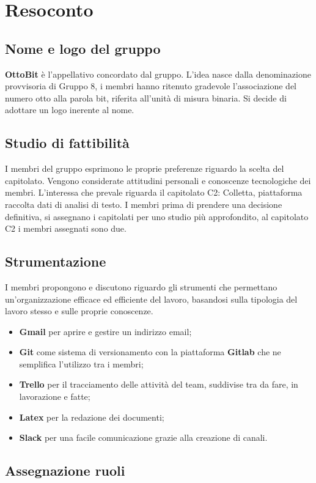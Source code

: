 \documentclass[11pt,a4paper]{article}
\begin{document}
	\section{Resoconto}	
	\subsection{Nome e logo del gruppo}
	\textbf{OttoBit} è l'appellativo concordato dal gruppo. L'idea nasce dalla denominazione provvisoria di Gruppo 8, i membri hanno ritenuto gradevole l'associazione del numero otto alla parola bit, riferita all'unità di misura binaria. Si decide di adottare un logo inerente al nome.
	\subsection{Studio di fattibilità}
	I membri del gruppo esprimono le proprie preferenze riguardo la scelta del capitolato. Vengono considerate attitudini personali e conoscenze tecnologiche dei membri. L'interessa che prevale riguarda il capitolato C2: Colletta, piattaforma raccolta dati di analisi di testo. I membri prima di prendere una decisione definitiva, si assegnano i capitolati per uno studio più approfondito, al capitolato C2 i membri assegnati sono due.
	\subsection{Strumentazione}	
	I membri propongono e discutono riguardo gli strumenti che permettano un'organizzazione efficace ed efficiente del lavoro,  basandosi sulla tipologia del lavoro stesso e sulle proprie conoscenze. 
	\begin{itemize}
	\item  \textbf{Gmail} per aprire e gestire un indirizzo email;
	\item  \textbf{Git} come sistema di versionamento con la piattaforma \textbf{Gitlab} che ne semplifica l'utilizzo tra i membri;
	\item  \textbf{Trello} per il tracciamento delle attività del team, suddivise tra da fare, in lavorazione e fatte;
	\item  \textbf{Latex} per la redazione dei documenti;
	\item \textbf{Slack} per una facile comunicazione grazie alla creazione di canali.
	\end{itemize}
	\subsection{Assegnazione ruoli} 
	
\end{document}
